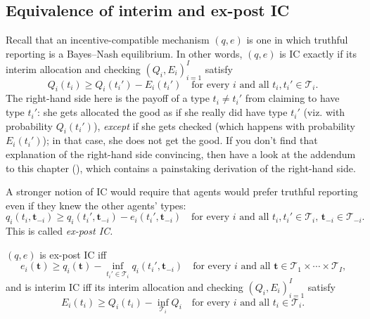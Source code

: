 \subsection{Equivalence of interim and ex-post IC}
\label{sec:ch2:bdl14:bic_epic}

Recall that an incentive-compatible mechanism $(q,e)$ is one in which truthful reporting is a Bayes--Nash equilibrium.
In other words, $(q,e)$ is IC exactly if its interim allocation and checking $(Q_i,E_i)_{i=1}^I$ satisfy
%
\begin{equation*}
	Q_i(t_i) \geq Q_i(t_i') - E_i(t_i')
	\quad \text{for every $i$ and all $t_i,t_i' \in \mathcal{T}_i$.}
\end{equation*}
%
The right-hand side here is the payoff of a type $t_i \neq t_i'$ from claiming to have type $t_i'$:
she gets allocated the good as if she really did have type $t_i'$ (viz. with probability $Q_i(t_i')$), \emph{except} if she gets checked (which happens with probability $E_i(t_i')$); in that case, she does not get the good.
If you don't find that explanation of the right-hand side convincing, then have a look at the addendum to this chapter (), which contains a painstaking derivation of the right-hand side.

A stronger notion of IC would require that agents would prefer truthful reporting even if they knew the other agents' types:
%
\begin{equation*}
	q_i(t_i,\boldsymbol{t}_{-i}) 
	\geq q_i(t_i',\boldsymbol{t}_{-i}) - e_i(t_i',\boldsymbol{t}_{-i})
	\quad \text{for every $i$ and all $t_i,t_i' \in \mathcal{T}_i$, $\boldsymbol{t}_{-i} \in \mathcal{T}_{-i}$.}
\end{equation*}
%
This is called \emph{ex-post IC.}

\begin{lemma}
	\label{lemma:bdl_epic}
	$(q,e)$ is ex-post IC iff
	\begin{equation*}
		e_i(\boldsymbol{t})
		\geq q_i(\boldsymbol{t})
		- \inf_{t_i' \in \mathcal{T}_i}
		q_i(t_i',\boldsymbol{t}_{-i})
		\quad \text{for every $i$ and all $\boldsymbol{t} \in \mathcal{T}_1 \times \cdots \times \mathcal{T}_I$,}
	\end{equation*}
	and is interim IC iff its interim allocation and checking $(Q_i,E_i)_{i=1}^I$ satisfy
	\begin{equation*}
		E_i(t_i)
		\geq Q_i(t_i) - \inf_{\mathcal{T}_i} Q_i
		\quad \text{for every $i$ and all $t_i \in \mathcal{T}_i$.}
	\end{equation*}
\end{lemma}

